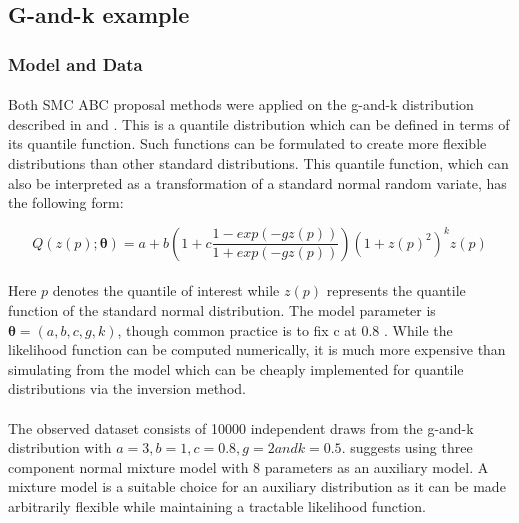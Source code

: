 \documentclass[12,fleqn]{article}
\theoremstyle{definition}
\theoremstyle{plain}
\begin{document}
%
%
%




\subsection{G-and-k example}
\subsubsection{Model and Data}
\paragraph{}
Both SMC ABC proposal methods were applied on the g-and-k distribution described in  and .
This is a quantile distribution which can be defined in terms of its quantile function. Such functions can be formulated to create more flexible distributions than other standard distributions. This quantile function, which can also be interpreted as a transformation of a standard normal random variate, has the following form:
\par
\begin{equation*}
Q(z(p); \boldsymbol{\theta} ) = a + b \left( 1 + c\frac{1 - exp(-gz(p))}{1 + exp(-gz(p))}	\right) (1 + z(p)^2 )^k z(p)
\end{equation*}
\paragraph{}
Here $p$ denotes the quantile of interest while $z(p)$ represents the quantile function of the standard normal distribution. The model parameter is $\boldsymbol{\theta} = (a, b, c, g, k)$, though common practice is to fix c at 0.8 \cite{rayner}. While the likelihood function can be computed numerically, it is much more expensive than simulating from the model which can be cheaply implemented for quantile distributions via the inversion method.
\par

\paragraph{}
The observed dataset consists of 10000 independent draws from the g-and-k distribution with $a = 3, b = 1, c = 0.8, g = 2 and k = 0.5$.  suggests using three component normal mixture model with 8 parameters as an auxiliary model. A mixture model is a suitable choice for an auxiliary distribution as it can be made arbitrarily flexible while maintaining a tractable likelihood function.
\par
\end{document}
